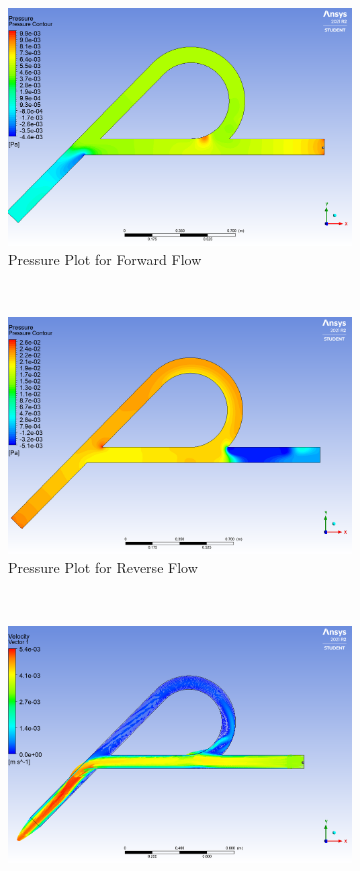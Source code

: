 \begin{figure}[H]
 \centering
\begin{subfigure}{.45\textwidth}
  \centering
  \includegraphics[width=.9\linewidth]{images/task2/myopt/forward_pressure.png}
  \caption{Pressure Plot for Forward Flow}
  \label{fig:x_d_norm}
\end{subfigure}%
~
\begin{subfigure}{.45\textwidth}
  \centering
  \includegraphics[width=.9\linewidth]{images/task2/myopt/reverse_pressure.png}
  \caption{Pressure Plot for Reverse Flow}
  \label{fig:x_d_norm_actual}
\end{subfigure}
~
\begin{subfigure}{.45\textwidth}
  \centering
  \includegraphics[width=.9\linewidth]{images/task2/myopt/forward_velocity.png}

\end{subfigure}
\end{figure}

